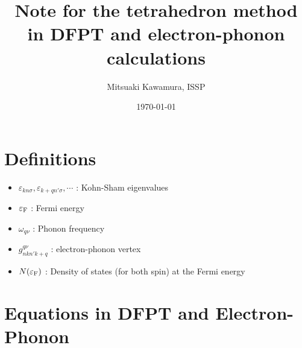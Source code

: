\documentclass[12pt]{article}
\begin{document}
%
\title{Note for the tetrahedron method in DFPT and electron-phonon calculations}
\author{Mitsuaki Kawamura, ISSP}
\date{\today}
\maketitle
%
\section{Definitions}

\begin{itemize}
\item $\varepsilon_{k n \sigma}, \varepsilon_{k+q n' \sigma}, \cdots$ : Kohn-Sham eigenvalues
\item $\varepsilon_{\rm F}$ : Fermi energy
\item $\omega_{q \nu}$ : Phonon frequency
\item $g^{q \nu}_{n k n' k+q}$ : electron-phonon vertex
\item $N(\varepsilon_{\rm F})$ : Density of states (for both spin) at the Fermi energy
\end{itemize}
%

\section{Equations in DFPT and Electron-Phonon}
\end{document}
